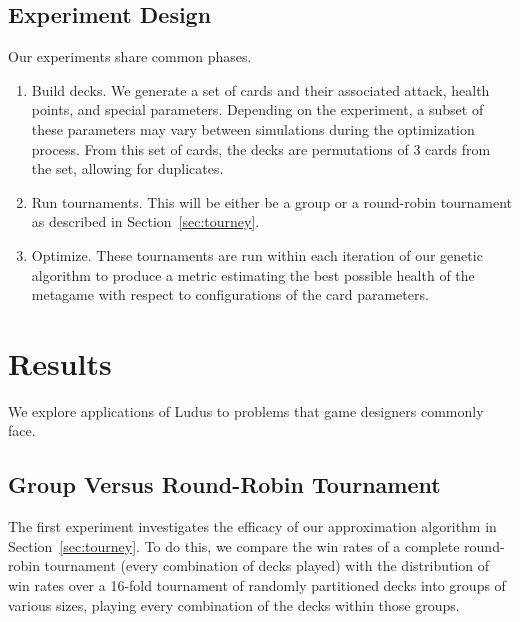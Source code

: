\documentclass[letterpaper]{article} %
\begin{document}
\subsection{Experiment Design}


Our experiments share common phases.

\begin{enumerate}
	\item Build decks. We generate a set of cards and their associated attack, health points, and special parameters.
	Depending on the experiment, a subset of these parameters may vary between simulations during the optimization process.
	From this set of cards, the decks are permutations of 3 cards from the set, allowing for duplicates.
	\item Run tournaments. This will be either be a group or a round-robin tournament as described in Section~\ref{sec:tourney}.
	\item Optimize. These tournaments are run within each iteration of our genetic algorithm to produce a metric estimating the best
	possible health of the metagame with respect to configurations of the card parameters. %
\end{enumerate}

\section{Results} \label{sec:results}
We explore applications of {\sc Ludus} to problems that game designers commonly face.

\subsection{Group Versus Round-Robin Tournament}

The first experiment %
investigates the efficacy of our approximation algorithm in Section~\ref{sec:tourney}. To do this, we compare the win rates %
of a complete round-robin tournament (every combination of decks played) with the distribution of win rates over a 16-fold tournament of %
randomly partitioned decks into groups of various sizes, playing every combination of the decks within those groups.
\end{document}
